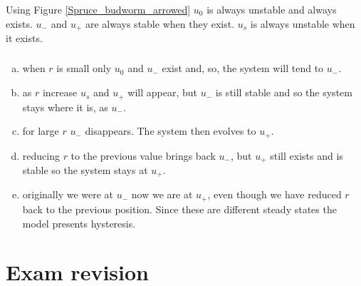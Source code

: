 \documentclass[]{article}
\newcommand{\fig}[1]{Figure \ref{#1}}
\begin{document}
\begin{Answ}
\subsubsection{}
Using \fig{Spruce_budworm_arrowed} $u_0$ is always unstable and always exists. $u_-$ and $u_+$ are always stable when they exist. $u_s$ is always unstable when it exists.
\subsubsection{}
\begin{enumerate}[(a)]
\item when $r$ is small only $u_0$ and $u_-$ exist and, so, the system will tend to $u_-$.
\item as $r$ increase $u_s$ and $u_+$ will appear, but $u_-$ is still stable and so the system stays where it is, as $u_-$.
\item for large $r$ $u_-$ disappears. The system then evolves to $u_+$.
\item reducing $r$ to the previous value brings back $u_-$, but $u_+$ still exists and is stable so the system stays at $u_+$.
\item originally we were at $u_-$ now we are at $u_+$, even though we have reduced $r$ back to the previous position. Since these are different steady states the model presents hysteresis.
\end{enumerate}
\end{Answ}

\section*{Exam revision}
\end{document}
